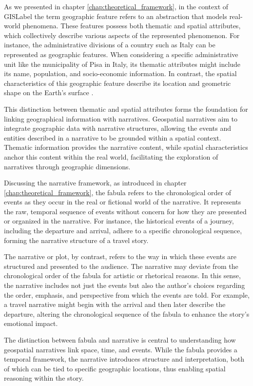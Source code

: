 As we presented in chapter \ref{chap:theoretical_framework}, in the context of \acrshort{GISLabel} the term geographic feature refers to an abstraction that models real-world phenomena. These features possess both thematic and spatial attributes, which collectively describe various aspects of the represented phenomenon. For instance, the administrative divisions of a country such as Italy can be represented as geographic features. When considering a specific administrative unit like the municipality of Pisa in Italy, its thematic attributes might include its name, population, and socio-economic information. In contrast, the spatial characteristics of this geographic feature describe its location and geometric shape on the Earth's surface \cite{longleyGeographicInformationScience2015}.

This distinction between thematic and spatial attributes forms the foundation for linking geographical information with narratives. Geospatial narratives aim to integrate geographic data with narrative structures, allowing the events and entities described in a narrative to be grounded within a spatial context. Thematic information provides the narrative content, while spatial characteristics anchor this content within the real world, facilitating the exploration of narratives through geographic dimensions.

Discussing the narrative framework, as introduced in chapter \ref{chap:theoretical_framework}, the fabula refers to the chronological order of events as they occur in the real or fictional world of the narrative. It represents the raw, temporal sequence of events without concern for how they are presented or organized in the narrative. For instance, the historical events of a journey, including the departure and arrival, adhere to a specific chronological sequence, forming the narrative structure of a travel story.

The narrative or plot, by contrast, refers to the way in which these events are structured and presented to the audience. The narrative may deviate from the chronological order of the fabula for artistic or rhetorical reasons. In this sense, the narrative includes not just the events but also the author's choices regarding the order, emphasis, and perspective from which the events are told. For example, a travel narrative might begin with the arrival and then later describe the departure, altering the chronological sequence of the fabula to enhance the story’s emotional impact.

The distinction between fabula and narrative is central to understanding how geospatial narratives link space, time, and events. While the fabula provides a temporal framework, the narrative introduces structure and interpretation, both of which can be tied to specific geographic locations, thus enabling spatial reasoning within the story.

